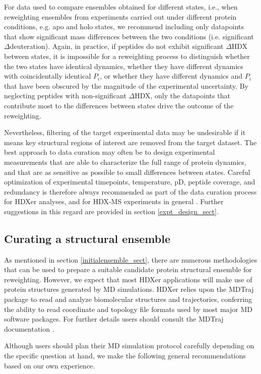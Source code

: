 \documentclass[9pt,tutorial]{livecoms}
\begin{document}
For data used to compare ensembles obtained for different states, i.e., when reweighting ensembles from experiments carried out under different protein conditions, e.g. apo and holo states, we recommend including only datapoints that show significant mass differences between the two conditions (i.e. significant $\Delta$deuteration).
Again, in practice, if peptides do not exhibit significant $\Delta$HDX between states, it is impossible for a reweighting process to distinguish whether the two states have identical dynamics, whether they have different dynamics with coincidentally identical $P_i$, or whether they have different dynamics and $P_i$ that have been obscured by the magnitude of the experimental uncertainty.
By neglecting peptides with non-significant $\Delta$HDX, only the datapoints that contribute most to the differences between states drive the outcome of the reweighting.

Nevertheless, filtering of the target experimental data may be undesirable if it means key structural regions of interest are removed from the target dataset.
The best approach to data curation may often be to design experimental measurements that are able to characterize the full range of protein dynamics, and that are as sensitive as possible to small differences between states.
Careful optimization of experimental timepoints, temperature, pD, peptide coverage, and redundancy is therefore always recommended as part of the data curation process for HDXer analyses, and for HDX-MS experiments in general \cite{Masson2019}.
Further suggestions in this regard are provided in section \ref{expt_design_sect}.

\subsection{Curating a structural ensemble}
As mentioned in section \ref{initialensemble_sect}, there are numerous methodologies that can be used to prepare a suitable candidate protein structural ensemble for reweighting.
However, we expect that most HDXer applications will make use of protein structures generated by MD simulations.
HDXer relies upon the MDTraj package to read and analyze biomolecular structures and trajectories, conferring the ability to read coordinate and topology file formats used by most major MD software packages.
For further details users should consult the MDTraj documentation \cite{McGibbon2015MDTraj}.

Although users should plan their MD simulation protocol carefully depending on the specific question at hand, we make the following general recommendations based on our own experience.
\end{document}
